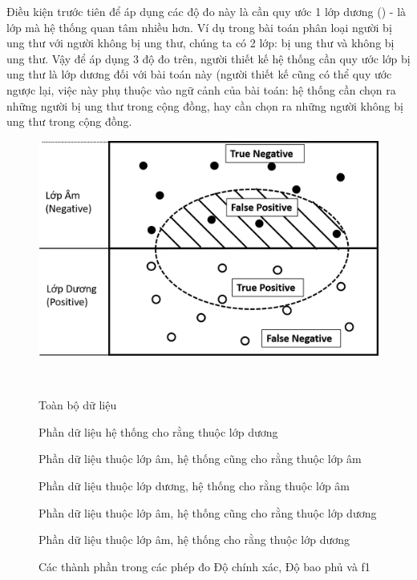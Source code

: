 Điều kiện trước tiên để áp dụng các độ đo này là cần quy ước 1 lớp dương () - là lớp mà hệ thống quan tâm nhiều hơn. Ví dụ trong bài toán phân loại người bị ung thư với người không bị ung thư, chúng ta có 2 lớp: bị ung thư và không bị ung thư. Vậy để áp dụng 3 độ đo trên, người thiết kế hệ thống cần quy ước lớp bị ung thư là lớp dương đối với bài toán này (người thiết kế cũng có thể quy ước ngược lại, việc này phụ thuộc vào ngữ cảnh của bài toán: hệ thống cần chọn ra những người bị ung thư trong cộng đồng, hay cần chọn ra những người không bị ung thư trong cộng đồng.
\begin{figure}[H]
\centering
\begin{minipage}{0.9\textwidth}
\includegraphics[scale=0.35]{../hinh/phepdo.png}
{\footnotesize \\
\begin{description}[noitemsep]
\item[Hình chữ nhật] Toàn bộ dữ liệu 
\item[Hình eclip] Phần dữ liệu hệ thống cho rằng thuộc lớp dương
\item[\term{True Negative}] Phần dữ liệu thuộc lớp âm, hệ thống cũng cho rằng thuộc lớp âm
\item[\term{False Negative}] Phần dữ liệu thuộc lớp dương, hệ thống cho rằng thuộc lớp âm
\item[\term{True Positive}] Phần dữ liệu thuộc lớp âm, hệ thống cũng cho rằng thuộc lớp dương
\item[\term{False Positive}] Phần dữ liệu thuộc lớp âm, hệ thống cho rằng thuộc lớp dương
\end{description}
\par}
\end{minipage}
\caption{Các thành phần trong các phép đo Độ chính xác, Độ bao phủ và f1}
\label{fig:phepdo}
\end{figure}

